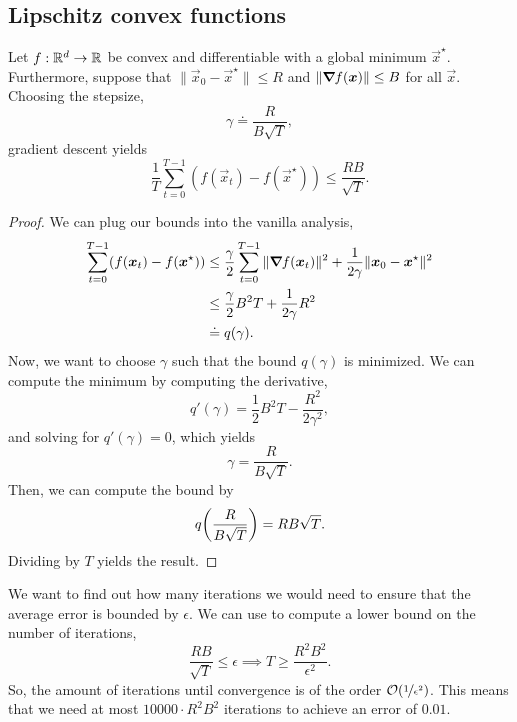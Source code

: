 \subsection{Lipschitz convex functions}


\begin{theorem} \label{thm:lipschitz}
    Let $f: \mathbb{R}^d \to \mathbb{R}$ be convex and differentiable with a global minimum $\vec{x}^\star$.
    Furthermore, suppose that $\|\vec{x}_0-\vec{x}^\star\| \leq R$ and $\|\bm{\nabla}_{\! } f(\bm{x})\| \leq B$
    for all $\vec{x}$. Choosing the stepsize, \[
        \gamma \doteq \frac{R}{B \sqrt{T}},
    \]
    gradient descent yields \[
        \frac{1}{T} \sum_{t=0}^{T-1} (f(\vec{x}_t) - f(\vec{x}^\star)) \leq \frac{RB}{\sqrt{T}}.
    \]
\end{theorem}

\begin{proof}
    We can plug our bounds into the vanilla analysis,
    \begin{align*}
        \sum_{t=0}^{T-1} (f(\bm{x}_t) - f(\bm{x}^\star)) & \leq \frac{\gamma}{2} \sum_{t=0}^{T-1} \|\bm{\nabla}_{\! } f(\bm{x}_t)\|^2 + \frac{1}{2\gamma} \|\bm{x}_0-\bm{x}^\star\|^2 \\
                                                           & \leq \frac{\gamma}{2} B^2 T + \frac{1}{2\gamma} R^2                                                                  \\
                                                           & \doteq q(\gamma).
    \end{align*}
    Now, we want to choose $\gamma$ such that the bound $q(\gamma)$ is minimized. We can compute the
    minimum by computing the derivative, \[
        q'(\gamma) = \frac{1}{2} B^2 T - \frac{R^2}{2 \gamma^2},
    \]
    and solving for $q'(\gamma) = 0$, which yields \[
        \gamma = \frac{R}{B \sqrt{T}}.
    \]
    Then, we can compute the bound by \[
        q \lft( \frac{R}{B \sqrt{T}} \rgt) = RB \sqrt{T}.
    \]
    Dividing by $T$ yields the result.
\end{proof}

We want to find out how many iterations we would need to ensure that the average error is bounded
by $\epsilon$. We can use  to compute a lower bound on the number of
iterations, \[
    \frac{RB}{\sqrt{T}} \leq \epsilon \implies T \geq \frac{R^2 B^2}{\epsilon^2}.
\]
So, the amount of iterations until convergence is of the order $\bigo{\nicefrac{1}{\epsilon^2}}$.
This means that we need at most $10000 \cdot R^2 B^2$ iterations to achieve an error of $0.01$.


